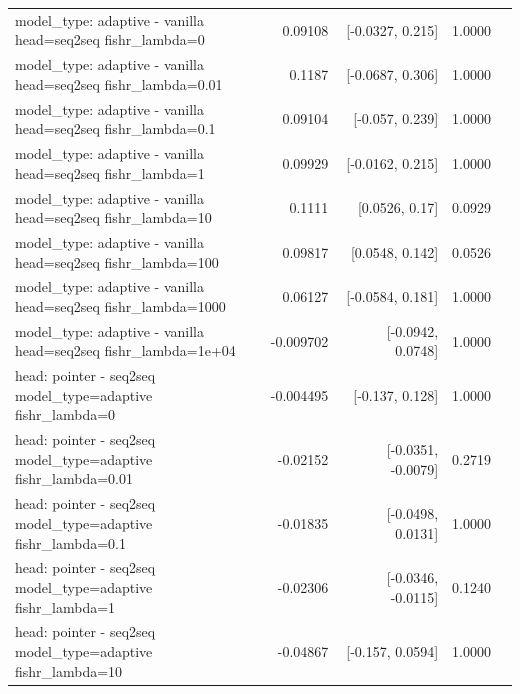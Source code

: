 \documentclass[10pt]{article}
\makeatletter
\newcommand{\stackcell}[1]{\begin{tabular}[t]{@{}l@{}}#1\end{tabular}}
\makeatother
\begin{document}
{\begin{longtable}{lrrrl}
\stackcell{model\_type: adaptive - vanilla\\\footnotesize head=seq2seq fishr\_lambda=0 } & 0.09108 & [-0.0327, 0.215] & 1.0000 & \\
\stackcell{model\_type: adaptive - vanilla\\\footnotesize head=seq2seq fishr\_lambda=0.01 } & 0.1187 & [-0.0687, 0.306] & 1.0000 & \\
\stackcell{model\_type: adaptive - vanilla\\\footnotesize head=seq2seq fishr\_lambda=0.1 } & 0.09104 & [-0.057, 0.239] & 1.0000 & \\
\stackcell{model\_type: adaptive - vanilla\\\footnotesize head=seq2seq fishr\_lambda=1 } & 0.09929 & [-0.0162, 0.215] & 1.0000 & \\
\stackcell{model\_type: adaptive - vanilla\\\footnotesize head=seq2seq fishr\_lambda=10 } & 0.1111 & [0.0526, 0.17] & 0.0929 & \\
\stackcell{model\_type: adaptive - vanilla\\\footnotesize head=seq2seq fishr\_lambda=100 } & 0.09817 & [0.0548, 0.142] & 0.0526 & \\
\stackcell{model\_type: adaptive - vanilla\\\footnotesize head=seq2seq fishr\_lambda=1000 } & 0.06127 & [-0.0584, 0.181] & 1.0000 & \\
\stackcell{model\_type: adaptive - vanilla\\\footnotesize head=seq2seq fishr\_lambda=1e+04 } & -0.009702 & [-0.0942, 0.0748] & 1.0000 & \\
\stackcell{head: pointer - seq2seq\\\footnotesize model\_type=adaptive fishr\_lambda=0 } & -0.004495 & [-0.137, 0.128] & 1.0000 & \\
\stackcell{head: pointer - seq2seq\\\footnotesize model\_type=adaptive fishr\_lambda=0.01 } & -0.02152 & [-0.0351, -0.0079] & 0.2719 & \\
\stackcell{head: pointer - seq2seq\\\footnotesize model\_type=adaptive fishr\_lambda=0.1 } & -0.01835 & [-0.0498, 0.0131] & 1.0000 & \\
\stackcell{head: pointer - seq2seq\\\footnotesize model\_type=adaptive fishr\_lambda=1 } & -0.02306 & [-0.0346, -0.0115] & 0.1240 & \\
\stackcell{head: pointer - seq2seq\\\footnotesize model\_type=adaptive fishr\_lambda=10 } & -0.04867 & [-0.157, 0.0594] & 1.0000 & \\

\end{longtable}}
\end{document}
